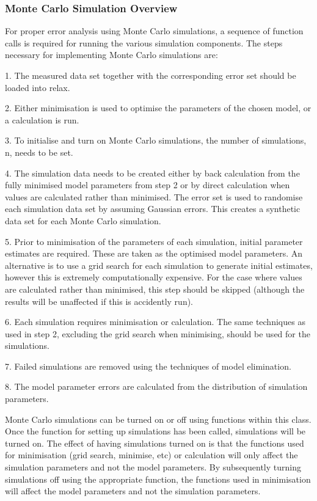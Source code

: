 \subsubsection{Monte Carlo Simulation Overview}

For proper error analysis using Monte Carlo simulations, a sequence of function calls is
required for running the various simulation components.  The steps necessary for
implementing Monte Carlo simulations are:

1.  The measured data set together with the corresponding error set should be loaded into
relax.

2.  Either minimisation is used to optimise the parameters of the chosen model, or a
calculation is run.

3.  To initialise and turn on Monte Carlo simulations, the number of simulations, n, needs
to be set.

4.  The simulation data needs to be created either by back calculation from the fully
minimised model parameters from step 2 or by direct calculation when values are calculated
rather than minimised.  The error set is used to randomise each simulation data set by
assuming Gaussian errors.  This creates a synthetic data set for each Monte Carlo
simulation.

5.  Prior to minimisation of the parameters of each simulation, initial parameter estimates
are required.  These are taken as the optimised model parameters.  An alternative is to use
a grid search for each simulation to generate initial estimates, however this is extremely
computationally expensive.  For the case where values are calculated rather than minimised,
this step should be skipped (although the results will be unaffected if this is accidently
run).

6.  Each simulation requires minimisation or calculation.  The same techniques as used in
step 2, excluding the grid search when minimising, should be used for the simulations.

7.  Failed simulations are removed using the techniques of model elimination.

8.  The model parameter errors are calculated from the distribution of simulation
parameters.


Monte Carlo simulations can be turned on or off using functions within this class.  Once the
function for setting up simulations has been called, simulations will be turned on.  The
effect of having simulations turned on is that the functions used for minimisation (grid
search, minimise, etc) or calculation will only affect the simulation parameters and not the
model parameters.  By subsequently turning simulations off using the appropriate function,
the functions used in minimisation will affect the model parameters and not the simulation
parameters.


